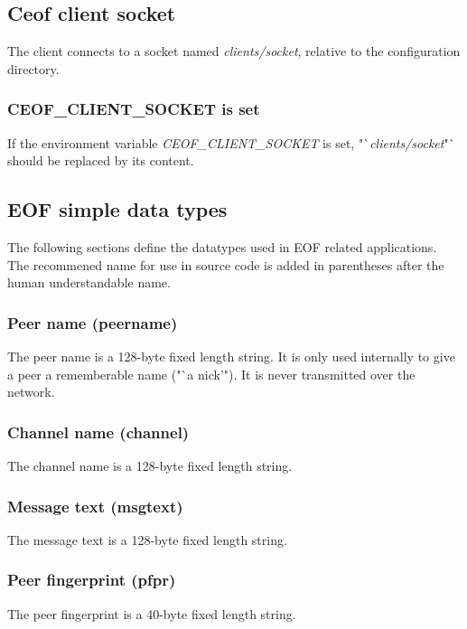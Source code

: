 \documentclass[12pt,a4paper]{book}
\begin{document}
\subsection{Ceof client socket}
The client connects to a socket named \textit{clients/socket}, relative
to the configuration directory.
\subsubsection{CEOF\_CLIENT\_SOCKET is set}
If the environment variable \textit{CEOF\_CLIENT\_SOCKET} is set,
"`\textit{clients/socket}"` should be replaced by its content.
\subsection{EOF simple data types}
The following sections define the datatypes used in EOF related
applications. The recommened name for use in source
code is added in parentheses after the human understandable name.
\subsubsection{Peer name (peername)}
The peer name is a 128-byte fixed length string. It is only
used internally to give a peer a rememberable name ("`a nick'").
It is never transmitted over the network.
\subsubsection{Channel name (channel)}
The channel name is a 128-byte fixed length string.
\subsubsection{Message text (msgtext)}
The message text is a 128-byte fixed length string.
\subsubsection{Peer fingerprint (pfpr)}
The peer fingerprint is a 40-byte fixed length string.
\end{document}
